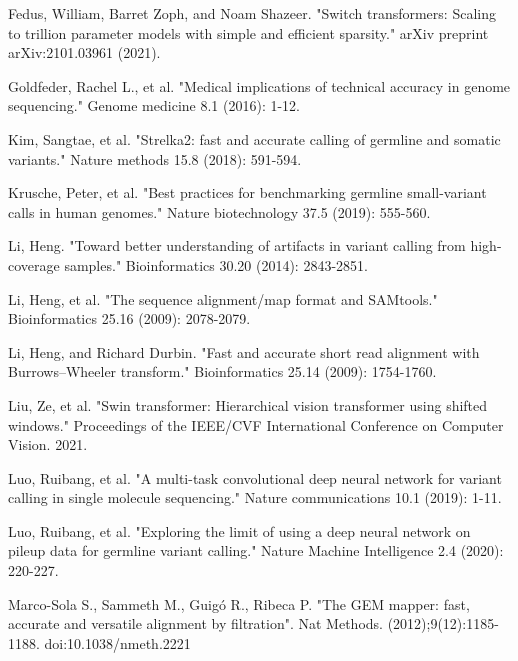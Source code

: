 \documentclass[]{article}
\begin{document}
\vspace{8pt}
Fedus, William, Barret Zoph, and Noam Shazeer. "Switch transformers: Scaling to trillion parameter models with simple and efficient sparsity." arXiv preprint arXiv:2101.03961 (2021).


\vspace{8pt}
Goldfeder, Rachel L., et al. "Medical implications of technical accuracy in genome sequencing." Genome medicine 8.1 (2016): 1-12.

\vspace{8pt}
Kim, Sangtae, et al. "Strelka2: fast and accurate calling of germline and somatic variants." Nature methods 15.8 (2018): 591-594.

\vspace{8pt}
Krusche, Peter, et al. "Best practices for benchmarking germline small-variant calls in human genomes." Nature biotechnology 37.5 (2019): 555-560.

\vspace{8pt}
Li, Heng. "Toward better understanding of artifacts in variant calling from high-coverage samples." Bioinformatics 30.20 (2014): 2843-2851.

\vspace{8pt}
Li, Heng, et al. "The sequence alignment/map format and SAMtools." Bioinformatics 25.16 (2009): 
2078-2079.


\vspace{8pt}
Li, Heng, and Richard Durbin. "Fast and accurate short read alignment with Burrows–Wheeler transform." Bioinformatics 25.14 (2009): 1754-1760.

\vspace{8pt}
Liu, Ze, et al. "Swin transformer: Hierarchical vision transformer using shifted windows." Proceedings of the IEEE/CVF International Conference on Computer Vision. 2021.

\vspace{8pt}
Luo, Ruibang, et al. "A multi-task convolutional deep neural network for variant calling in single molecule sequencing." Nature communications 10.1 (2019): 1-11.

\vspace{8pt}
Luo, Ruibang, et al. "Exploring the limit of using a deep neural network on pileup data for germline variant calling." Nature Machine Intelligence 2.4 (2020): 220-227.

\vspace{8pt}
Marco-Sola S., Sammeth M., Guigó R., Ribeca P. "The GEM mapper: fast, accurate and versatile alignment by filtration". Nat Methods. (2012);9(12):1185-1188. doi:10.1038/nmeth.2221
\end{document}
